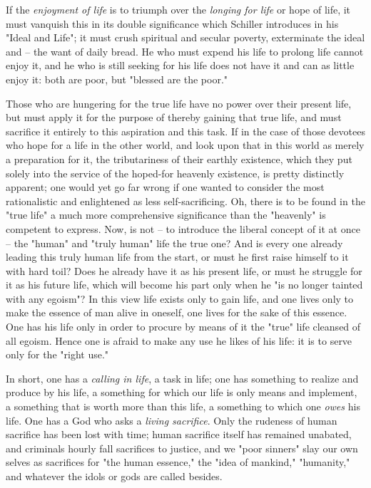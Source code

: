 If the \textit{enjoyment of life} is to triumph over the \textit{longing for 
life} or hope of life, it must vanquish this in its double significance which 
Schiller introduces in his "{}Ideal and Life"{}; it must crush spiritual and 
secular poverty, exterminate the ideal and -- the want of daily bread. He who 
must expend his life to prolong life cannot enjoy it, and he who is still 
seeking for his life does not have it and can as little enjoy it: both are 
poor, but "{}blessed are the poor."{}

Those who are hungering for the true life have no power over their present 
life, but must apply it for the purpose of thereby gaining that true life, and 
must sacrifice it entirely to this aspiration and this task. If in the case of 
those devotees who hope for a life in the other world, and look upon that in 
this world as merely a preparation for it, the tributariness of their earthly 
existence, which they put solely into the service of the hoped-for heavenly 
existence, is pretty distinctly apparent; one would yet go far wrong if one 
wanted to consider the most rationalistic and enlightened as less 
self-sacrificing. Oh, there is to be found in the "{}true life"{} a much more 
comprehensive significance than the "{}heavenly"{} is competent to express. 
Now, is not -- to introduce the liberal concept of it at once -- the 
"{}human"{} and "{}truly human"{} life the true one? And is every one already 
leading this truly human life from the start, or must he first raise himself 
to it with hard toil? Does he already have it as his present life, or must he 
struggle for it as his future life, which will become his part only when he 
"{}is no longer tainted with any egoism"{}? In this view life exists only to 
gain life, and one lives only to make the essence of man alive in oneself, one 
lives for the sake of this essence. One has his life only in order to procure 
by means of it the "{}true"{} life cleansed of all egoism. Hence one is afraid 
to make any use he likes of his life: it is to serve only for the "{}right 
use."{}

In short, one has a \textit{calling in life}, a task in life; one has 
something to realize and produce by his life, a something for which our life 
is only means and implement, a something that is worth more than this life, a 
something to which one \textit{owes} his life. One has a God who asks a 
\textit{living sacrifice}. Only the rudeness of human sacrifice has been lost 
with time; human sacrifice itself has remained unabated, and criminals hourly 
fall sacrifices to justice, and we "{}poor sinners"{} slay our own selves as 
sacrifices for "{}the human essence,"{} the "{}idea of mankind,"{} 
"{}humanity,"{} and whatever the idols or gods are called besides.

